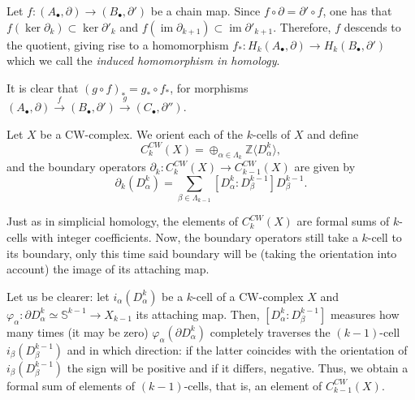 \begin{definition}
    Let $f \colon (A_\bullet, \partial) \to (B_\bullet, \partial')$ be a chain map. Since $f \circ \partial = \partial' \circ f$, one has that
    $f(\ker \partial_k) \subset \ker \partial'_k$ and $f(\operatorname{im} \partial_{k+1}) \subset \operatorname{im} \partial'_{k+1}$. Therefore, \( f \) descends to the quotient, giving rise to a homomorphism $f_* \colon H_k(A_\bullet, \partial) \to H_k(B_\bullet, \partial')$ which we call the \textit{induced homomorphism in homology}.

\end{definition}
\begin{remark}
    It is clear that $(g \circ f)_* = g_* \circ f_*$,
    for morphisms $(A_\bullet, \partial) \xrightarrow{f} (B_\bullet, \partial') \xrightarrow{g} (C_\bullet, \partial'')$.
\end{remark}

\bigskip

\begin{definition}
    Let $X$ be a CW-complex. We orient each of the $k$-cells of $X$ and define
    \begin{equation*}
        C^{CW}_k(X) = \oplus_{\alpha\in\Lambda_k} \mathbb{Z} \langle D^k_{\alpha}\rangle,
    \end{equation*}
    and the boundary operators $\partial_k : C^{CW}_k(X) \to C^{CW}_{k-1}(X)$ are given by
    \begin{equation*}
        \partial_k(D^k_{\alpha}) = \sum_{\beta\in\Lambda_{k-1}}[D^k_{\alpha}:D^{k-1}_{\beta}]D^{k-1}_{\beta}.
    \end{equation*}
\end{definition}


Just as in simplicial homology, the elements of $C^{CW}_k(X)$ are formal sums of $k$-cells with integer coefficients. Now, the boundary operators still take a $k$-cell to its boundary, only this time said boundary will be (taking the orientation into account) the image of its attaching map.

Let us be clearer: let $i_{\alpha}(D^k_{\alpha})$ be a $k$-cell of a CW-complex $X$ and $\varphi_{\alpha}: \partial D_{\alpha}^k \simeq \mathbb{S}^{k-1} \to X_{k-1}$ its attaching map. Then, $[D^k_{\alpha}:D^{k-1}_{\beta}]$ measures how many times (it may be zero) $\varphi_{\alpha}(\partial D_{\alpha}^k)$ completely traverses the $(k-1)$-cell $i_{\beta}(D^{k-1}_{\beta})$ and in which direction: if the latter coincides with the orientation of $i_{\beta}(D^{k-1}_{\beta})$ the sign will be positive and if it differs, negative. Thus, we obtain a formal sum of elements of $(k-1)$-cells, that is, an element of $C^{CW}_{k-1}(X)$.

